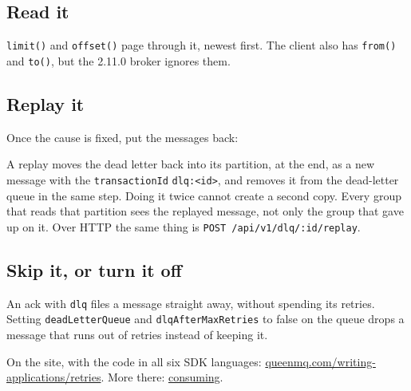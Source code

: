 \subsection{Read it}


\texttt{limit()} and \texttt{offset()} page through it, newest first. The client also has
\texttt{from()} and \texttt{to()}, but the 2.11.0 broker ignores them.

\subsection{Replay it}

Once the cause is fixed, put the messages back:


A replay moves the dead letter back into its partition, at the end, as a new message with the
\texttt{transactionId} \texttt{dlq:<id>}, and removes it from the dead-letter queue in the same
step. Doing it twice cannot create a second copy. Every group that reads that partition sees the
replayed message, not only the group that gave up on it. Over HTTP the same thing is
\texttt{POST /api/v1/dlq/:id/replay}.


\subsection{Skip it, or turn it off}

An ack with \texttt{dlq} files a message straight away, without spending its retries. Setting
\texttt{deadLetterQueue} and \texttt{dlqAfterMaxRetries} to false on the queue drops a message
that runs out of retries instead of keeping it.


On the site, with the code in all six SDK languages: \href{https://queenmq.com/writing-applications/retries/}{queenmq.com/writing-applications/retries}. More there: \href{https://queenmq.com/writing-applications/pop/}{consuming}.
